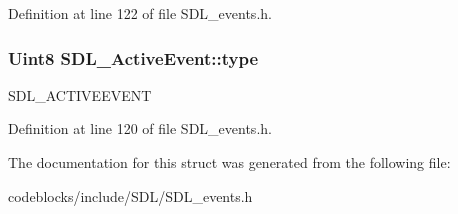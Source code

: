 Definition at line 122 of file S\+D\+L\+\_\+events.\+h.

\hypertarget{structSDL__ActiveEvent_a4a719c0224f4c0079043432f540621c4}{
\subsubsection[{type}]{\setlength{\rightskip}{0pt plus 5cm}Uint8 S\+D\+L\+\_\+\+Active\+Event\+::type}}\label{structSDL__ActiveEvent_a4a719c0224f4c0079043432f540621c4}
S\+D\+L\+\_\+\+A\+C\+T\+I\+V\+E\+E\+V\+E\+N\+T 

Definition at line 120 of file S\+D\+L\+\_\+events.\+h.



The documentation for this struct was generated from the following file\+:\begin{DoxyCompactItemize}
\item 
codeblocks/include/\+S\+D\+L/S\+D\+L\+\_\+events.\+h\end{DoxyCompactItemize}
